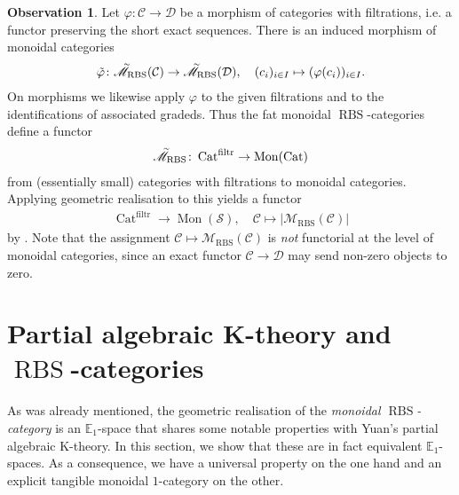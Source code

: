 \documentclass[12pt, reqno]{amsart}
\theoremstyle{plain}
\theoremstyle{definition}
\newtheorem{observation}[theorem]{Observation}
\renewcommand{\phi}{\varphi}
\begin{document}
\begin{observation}
Let $\phi\colon \mathcal{C}\rightarrow \mathcal{D}$ be a morphism of categories with filtrations, i.e. a functor preserving the short exact sequences. There is an induced morphism of monoidal categories
\begin{align*}
\tilde{\phi}\colon \accentset{\sim}{\mathscr{M}}_{\operatorname{RBS}}(\mathcal{C})\rightarrow \accentset{\sim}{\mathscr{M}}_{\operatorname{RBS}}(\mathcal{D}), \quad (c_i)_{i\in I}\mapsto (\phi(c_i))_{i\in I}.
\end{align*}
On morphisms we likewise apply $\phi$ to the given filtrations and to the identifications of associated gradeds. Thus the fat monoidal $\operatorname{RBS}$-categories define a functor
\begin{align*}
\accentset{\sim}{\mathscr{M}}_{\operatorname{RBS}}\colon \operatorname{Cat}^{\operatorname{filtr}}\rightarrow \operatorname{Mon}(\operatorname{Cat})
\end{align*}
from (essentially small) categories with filtrations to monoidal categories. Applying geometric realisation to this yields a functor
\begin{align*}
\operatorname{Cat}^{\operatorname{filtr}}\rightarrow \operatorname{Mon}(\mathcal{S}),\quad \mathcal{C}\mapsto |\mathscr{M}_{\operatorname{RBS}}(\mathcal{C})|
\end{align*}
by . Note that the assignment $\mathcal{C}\mapsto \mathscr{M}_{\operatorname{RBS}}(\mathcal{C})$ is \textit{not} functorial at the level of monoidal categories, since an exact functor $\mathcal{C}\rightarrow \mathcal{D}$ may send non-zero objects to zero.
\end{observation}



\section{Partial algebraic K-theory and \texorpdfstring{$\operatorname{RBS}$}{RBS}-categories}\label{partial k-theory}

As was already mentioned, the geometric realisation of the \textit{monoidal $\operatorname{RBS}$-category} is an $\mathbb{E}_1$-space that shares some notable properties with Yuan's partial algebraic K-theory. In this section, we show that these are in fact equivalent $\mathbb{E}_1$-spaces. As a consequence, we have a universal property on the one hand and an explicit tangible monoidal $1$-category on the other.
\end{document}

